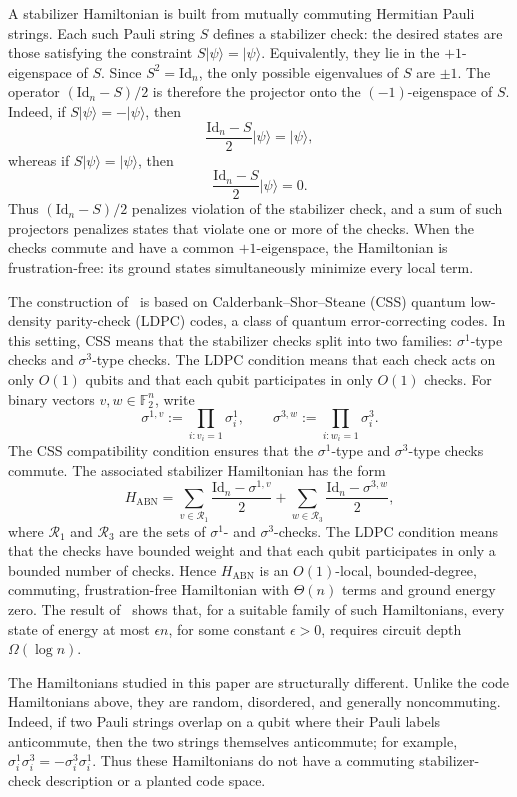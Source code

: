 \documentclass[12pt]{article}
\begin{document}
\begin{appendix}
A stabilizer Hamiltonian is built from mutually commuting Hermitian Pauli strings. Each such Pauli string \(S\)
defines a stabilizer check: the desired states are those satisfying the
constraint \(S|\psi\rangle=|\psi\rangle\). Equivalently, they lie in the
\(+1\)-eigenspace of \(S\). Since \(S^2=\mathrm{Id}_n\), the only possible eigenvalues of
\(S\) are \(\pm1\). The operator \((\mathrm{Id}_n-S)/2\) is therefore the projector onto
the \((-1)\)-eigenspace of \(S\). Indeed, if
\(S|\psi\rangle=-|\psi\rangle\), then
\[
    \frac{\mathrm{Id}_n-S}{2}|\psi\rangle=|\psi\rangle,
\]
whereas if \(S|\psi\rangle=|\psi\rangle\), then
\[
    \frac{\mathrm{Id}_n-S}{2}|\psi\rangle=0.
\]
Thus \((\mathrm{Id}_n-S)/2\) penalizes violation of the stabilizer check, and a sum of such
projectors penalizes states that violate one or more of the checks. When the
checks commute and have a common \(+1\)-eigenspace, the Hamiltonian is
frustration-free: its ground states simultaneously minimize every local term.

The construction of~\cite{anshu2023nlts} is based on Calderbank--Shor--Steane (CSS) quantum low-density parity-check (LDPC) codes, a class of quantum error-correcting codes. In this setting, CSS means that the stabilizer checks split into two families: \(\sigma^1\)-type checks and \(\sigma^3\)-type checks.
The LDPC condition means that each check acts on only \(O(1)\) qubits and that
each qubit participates in only \(O(1)\) checks. For binary
vectors \(v,w\in\mathbb F_2^n\), write
\[
    \sigma^{1,v}:=\prod_{i:v_i=1}\sigma_i^1,
    \qquad
    \sigma^{3,w}:=\prod_{i:w_i=1}\sigma_i^3 .
\]
The CSS compatibility condition ensures that the \(\sigma^1\)-type and
\(\sigma^3\)-type checks commute. The associated stabilizer Hamiltonian has
the form
\[
    H_{\mathrm{ABN}}
    =
    \sum_{v\in \mathcal R_1} \frac{\mathrm{Id}_n-\sigma^{1,v}}{2}
    +
    \sum_{w\in \mathcal R_3} \frac{\mathrm{Id}_n-\sigma^{3,w}}{2},
\]
where \(\mathcal R_1\) and \(\mathcal R_3\) are the sets of
\(\sigma^1\)- and \(\sigma^3\)-checks. The LDPC condition means that the
checks have bounded weight and that each qubit participates in only a bounded number of checks. Hence \(H_{\mathrm{ABN}}\) is an \(O(1)\)-local, bounded-degree, commuting, frustration-free Hamiltonian with \(\Theta(n)\) terms and ground energy zero. The result of~\cite{anshu2023nlts} shows that, for a suitable family of such Hamiltonians, every state of energy at most \(\epsilon n\), for some constant \(\epsilon>0\), requires circuit depth \(\Omega(\log n)\).

The Hamiltonians studied in this paper are structurally different. Unlike the code Hamiltonians above, they are random, disordered, and generally
noncommuting. Indeed, if two Pauli strings overlap on a qubit where their Pauli labels anticommute, then the two strings themselves anticommute; for example, $\sigma_i^1\sigma_i^3=-\sigma_i^3\sigma_i^1$. Thus these Hamiltonians do not have a commuting stabilizer-check description or a planted code space.


\end{appendix}
\end{document}
